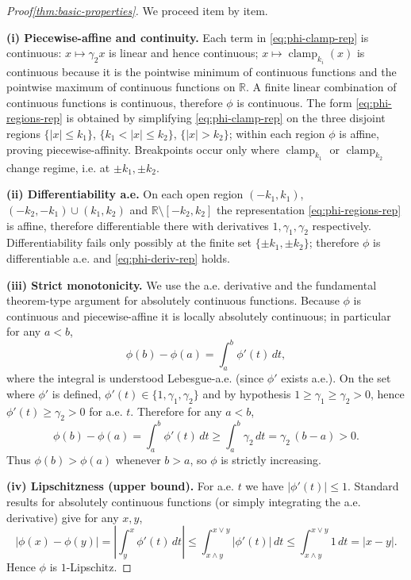 \documentclass[11pt, twoside, openright, english]{article}
\DeclareMathOperator{\clamp}{clamp}
\newcommand{\R}{\mathbb{R}}
\numberwithin{equation}{section}
\theoremstyle{plain}
\theoremstyle{definition}
\theoremstyle{remark}
\begin{document}
\begin{proof}[Proof\ref{thm:basic-properties}]
We proceed item by item.

\medskip\noindent\textbf{(i) Piecewise-affine and continuity.} Each term in \eqref{eq:phi-clamp-rep} is continuous: $x\mapsto \gamma_2 x$ is linear and hence continuous; $x\mapsto\clamp_{k_i}(x)$ is continuous because it is the pointwise minimum of continuous functions and the pointwise maximum of continuous functions on $\R$. A finite linear combination of continuous functions is continuous, therefore $\phi$ is continuous. The form \eqref{eq:phi-regions-rep} is obtained by simplifying \eqref{eq:phi-clamp-rep} on the three disjoint regions $\{|x|\le k_1\}$, $\{k_1<|x|\le k_2\}$, $\{|x|>k_2\}$; within each region $\phi$ is affine, proving piecewise-affinity. Breakpoints occur only where $\clamp_{k_1}$ or $\clamp_{k_2}$ change regime, i.e. at $\pm k_1,\pm k_2$.

\medskip\noindent\textbf{(ii) Differentiability a.e.} On each open region $( -k_1,k_1)$, $( -k_2,-k_1)\cup(k_1,k_2)$ and $\R\setminus[-k_2,k_2]$ the representation \eqref{eq:phi-regions-rep} is affine, therefore differentiable there with derivatives $1,\gamma_1,\gamma_2$ respectively. Differentiability fails only possibly at the finite set $\{\pm k_1,\pm k_2\}$; therefore $\phi$ is differentiable a.e. and \eqref{eq:phi-deriv-rep} holds.

\medskip\noindent\textbf{(iii) Strict monotonicity.} We use the a.e. derivative and the fundamental theorem-type argument for absolutely continuous functions. Because $\phi$ is continuous and piecewise-affine it is locally absolutely continuous; in particular for any $a<b$,
\[
\phi(b)-\phi(a)=\int_a^b \phi'(t)\,dt,
\]
where the integral is understood Lebesgue-a.e. (since $\phi'$ exists a.e.). On the set where $\phi'$ is defined, $\phi'(t)\in\{1,\gamma_1,\gamma_2\}$ and by hypothesis $1\ge\gamma_1\ge\gamma_2>0$, hence $\phi'(t)\ge \gamma_2>0$ for a.e. $t$. Therefore for any $a<b$,
\[
\phi(b)-\phi(a) = \int_a^b \phi'(t)\,dt \ge \int_a^b \gamma_2\,dt = \gamma_2\,(b-a) > 0.
\]
Thus $\phi(b)>\phi(a)$ whenever $b>a$, so $\phi$ is strictly increasing.

\medskip\noindent\textbf{(iv) Lipschitzness (upper bound).} For a.e. $t$ we have $|\phi'(t)|\le 1$. Standard results for absolutely continuous functions (or simply integrating the a.e. derivative) give for any $x,y$,
\[
|\phi(x)-\phi(y)| = \left|\int_y^x \phi'(t)\,dt\right| \le \int_{x\wedge y}^{x\vee y} |\phi'(t)|\,dt \le \int_{x\wedge y}^{x\vee y} 1\,dt = |x-y|.
\]
Hence $\phi$ is $1$-Lipschitz.


\end{proof}
\end{document}
